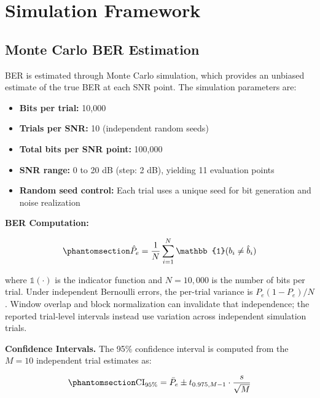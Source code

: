 \section{Simulation Framework}\label{sec:simulation-framework}

\subsection{Monte Carlo BER Estimation}\label{sec:monte-carlo-ber-estimation}

BER is estimated through Monte Carlo simulation, which provides an unbiased estimate of the true BER at each SNR point. The simulation parameters are:

\begin{itemize}
\tightlist
\item
  \textbf{Bits per trial:} 10,000
\item
  \textbf{Trials per SNR:} 10 (independent random seeds)
\item
  \textbf{Total bits per SNR point:} 100,000
\item
  \textbf{SNR range:} 0 to 20 dB (step: 2 dB), yielding 11 evaluation points
\item
  \textbf{Random seed control:} Each trial uses a unique seed for bit generation and noise realization
\end{itemize}

\textbf{BER Computation:}

\begin{equation}\protect\phantomsection\label{eq:ber-estimate}{\hat{P}_e = \frac{1}{N}\sum_{i=1}^{N} \mathbb{1}(b_i \neq \hat{b}_i)
}\end{equation}

where \(\mathbb{1}(\cdot)\) is the indicator function and \(N = 10{,}000\) is the number of bits per trial. Under independent Bernoulli errors, the per-trial variance is \(P_e(1-P_e)/N\). Window overlap and block normalization can invalidate that independence; the reported trial-level intervals instead use variation across independent simulation trials.

\textbf{Confidence Intervals.} The 95\% confidence interval is computed from the \(M = 10\) independent trial estimates as:

\begin{equation}\protect\phantomsection\label{eq:confidence-interval}{\text{CI}_{95\%} = \bar{P}_e \pm t_{0.975, M-1} \cdot \frac{s}{\sqrt{M}}
}\end{equation}


